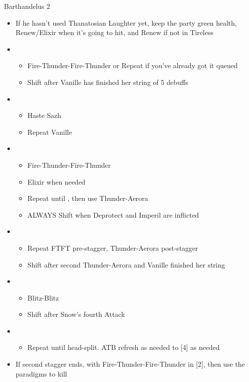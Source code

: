 \begin{battle}{Barthandelus 2}
\begin{multicols}{2}
\begin{itemize}
\begin{itemize}
    \end{itemize}
    \columnbreak
    \item If he hasn't used Thanatosian Laughter yet, keep the party green health, Renew/Elixir when it's going to hit, and Renew if not in Tireless
    \item \fifth
    \begin{itemize}
        \item Fire-Thunder-Fire-Thunder or Repeat if you've already got it queued
        \item Shift after Vanille has finished her string of 5 debuffs
    \end{itemize}
    \item \first
    \begin{itemize}
        \item Haste Sazh
        \item Repeat Vanille
    \end{itemize}
    \item \fifth
    \begin{itemize}
        \item Fire-Thunder-Fire-Thunder
        \item Elixir when needed
        \item Repeat until \stagger, then use Thunder-Aerora
        \item ALWAYS Shift when Deprotect and Imperil are inflicted
    \end{itemize}
    \item \second
    \begin{itemize}
        \item Repeat FTFT pre-stagger, Thunder-Aerora post-stagger
        \item Shift after second Thunder-Aerora and Vanille finished her string
    \end{itemize}
    \item \fourth
    \begin{itemize}
        \item Blitz-Blitz
        \item Shift after Snow's fourth Attack
    \end{itemize}
    \item \sixth
    \begin{itemize}
        \item Repeat until head-split. ATB refresh as needed to [4] as needed
    \end{itemize}
    \item If second stagger ends, \stagger with \linebreak Fire-Thunder-Fire-Thunder in [2], then use the \com paradigms to kill
\end{itemize}
\null
\end{multicols}
\end{battle}
